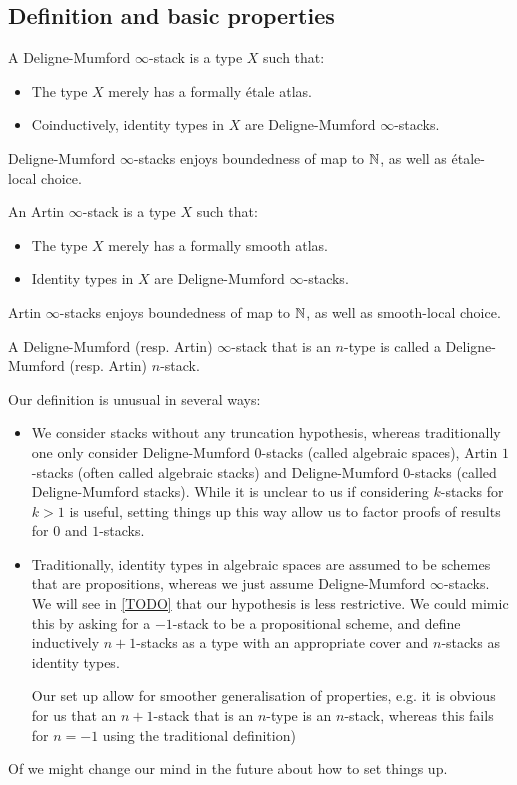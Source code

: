 \subsection{Definition and basic properties}

\begin{definition}
A Deligne-Mumford $\infty$-stack is a type $X$ such that:
\begin{itemize}
\item The type $X$ merely has a formally étale atlas. 
\item Coinductively, identity types in $X$ are Deligne-Mumford $\infty$-stacks.
\end{itemize}
\end{definition}

Deligne-Mumford $\infty$-stacks enjoys boundedness of map to $\mathbb{N}$, as well as étale-local choice.

\begin{definition}
An Artin $\infty$-stack is a type $X$ such that:
\begin{itemize}
\item The type $X$ merely has a formally smooth atlas. 
\item Identity types in $X$ are Deligne-Mumford $\infty$-stacks.
\end{itemize}
\end{definition}

Artin $\infty$-stacks enjoys boundedness of map to $\mathbb{N}$, as well as smooth-local choice.

\begin{definition}
A Deligne-Mumford (resp. Artin) $\infty$-stack that is an $n$-type is called a Deligne-Mumford (resp. Artin) $n$-stack.
\end{definition}

\begin{remark}
Our definition is unusual in several ways:
\begin{itemize}
\item We consider stacks without any truncation hypothesis, whereas traditionally one only consider Deligne-Mumford $0$-stacks (called algebraic spaces), Artin $1$-stacks (often called algebraic stacks) and Deligne-Mumford $0$-stacks (called Deligne-Mumford stacks). While it is unclear to us if considering $k$-stacks for $k>1$ is useful, setting things up this way allow us to factor proofs of results for $0$ and $1$-stacks.
\item Traditionally, identity types in algebraic spaces are assumed to be schemes that are propositions, whereas we just assume Deligne-Mumford $\infty$-stacks. We will see in \cref{TODO} that our hypothesis is less restrictive. We could mimic this by asking for a $-1$-stack to be a propositional scheme, and define inductively $n+1$-stacks as a type with an appropriate cover and $n$-stacks as identity types.

Our set up allow for smoother generalisation of properties, e.g. it is obvious for us that an $n+1$-stack that is an $n$-type is an $n$-stack, whereas this fails for $n=-1$ using the traditional definition)
\end{itemize}
Of we might change our mind in the future about how to set things up.
\end{remark}

